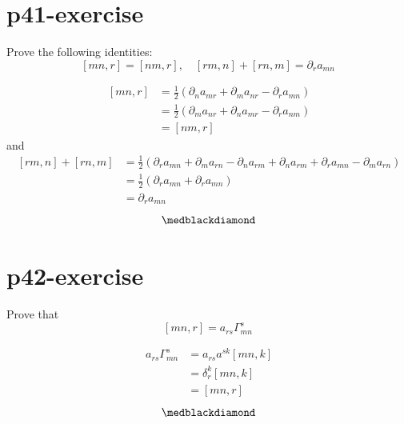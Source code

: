 \section{p41-exercise}
\begin{tcolorbox}
Prove the following identities: $$ [mn,r] = [nm,r], \quad [rm,n]+[rn,m] = \partial_r a_{mn}$$
\end{tcolorbox}
\begin{align}
\ [mn,r] &= \frac{1}{2}(\partial_{n} a_{mr}+ \partial_{m} a_{nr} - \partial_{r} a_{mn})\\
\ &= \frac{1}{2}(\partial_{m} a_{nr} + \partial_{n} a_{mr}  - \partial_{r} a_{nm})\\
\ &=[nm,r] 
\end{align}
and 
\begin{align}
\ [rm,n] + [rn,m]&= \frac{1}{2}(\partial_{r} a_{mn}+ \partial_{m} a_{rn} - \partial_{n} a_{rm} + \partial_{n} a_{rm}+ \partial_{r} a_{mn} - \partial_{m} a_{rn})\\
\ &= \frac{1}{2}(\partial_{r} a_{mn}+\partial_{r} a_{mn})\\
\ &=\partial_{r} a_{mn}
\end{align}
$$\medblackdiamond$$
\newpage

\section{p42-exercise}
\begin{tcolorbox}
Prove that  $$ [mn,r] = a_{rs}\Gamma^s_{mn}$$
\end{tcolorbox}
\begin{align}
\ a_{rs}\Gamma^s_{mn} & = a_{rs}a^{sk}[mn,k]\\
\ & = \delta^k_r[mn,k]\\
\ &= [mn,r]
\end{align}
$$\medblackdiamond$$
\newpage


